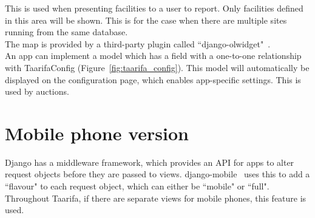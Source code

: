 This is used when presenting facilities to a user to report. Only facilities defined in this area will be shown. This is for the case when there are multiple sites running from the same database. \\

The map is provided by a third-party plugin called ``django-olwidget"~\cite{olwidget}. \\

An app can implement a model which has a field with a one-to-one relationship with TaarifaConfig (Figure~\ref{fig:taarifa_config}). This model will automatically be displayed on the configuration page, which enables app-specific settings. This is used by auctions.

\section{Mobile phone version}
\label{sec:di:mobile}

Django has a middleware framework, which provides an \gls{API} for apps to alter request objects before they are passed to views. django-mobile~\cite{mobile} uses this to add a ``flavour" to each request object, which can either be ``mobile" or ``full". Throughout Taarifa, if there are separate views for mobile phones, this feature is used.